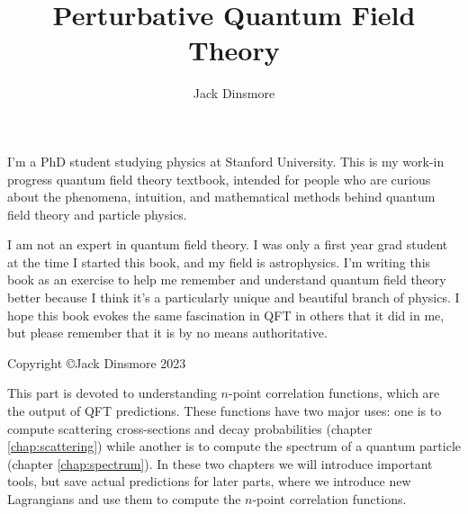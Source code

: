 \documentclass[11pt, a5paper]{memoir}
\title{Perturbative Quantum Field Theory}
\author{Jack Dinsmore}
\makeatletter
\let\LaTeXStandardPart\part
\newcommand{\unstarredpart@@noopt}[1]{
  \unstarredpart@@opt[#1]{#1}
}
\newcommand{\unstarredpart@@opt}[2][]{
  \cleardoublepage%
  \begingroup
  \let\newpage\relax
  \LaTeXStandardPart[#1]{#2}
  \endgroup
}
\newcommand{\starredpart}[1]{\LaTeXStandardPart*{#1}}
\newcommand{\unstarredpart}{\@ifnextchar[{\unstarredpart@@opt}{\unstarredpart@@noopt}}
\renewcommand{\part}{\@ifstar{\starredpart}{\unstarredpart}}
\newcounter{questioncounter}
\makeatother
\begin{document}
\setcounter{questioncounter}{1}

\frontmatter
\maketitle
\clearpage

\linespread{1.12}\selectfont
\begin{vplace}[0.7]
  \begin{adjustwidth}{0.5in}{0.5in}
    \centering
    \small 
    I'm a PhD student studying physics at Stanford University. This is my work-in progress quantum field theory textbook, intended for people who are curious about the phenomena, intuition, and mathematical methods behind quantum field theory and particle physics. 
  
    \vspace{1cm}

    I am not an expert in quantum field theory. I was only a first year grad student at the time I started this book, and  my field is astrophysics. I'm writing this book as an exercise to help me remember and understand quantum field theory better because I think it's a particularly unique and beautiful branch of physics. I hope this book evokes the same fascination in QFT in others that it did in me, but please remember that it is by no means authoritative.
    
    \vspace{1cm}
  
    Copyright \copyright Jack Dinsmore 2023
  \end{adjustwidth}
\end{vplace}
\clearpage
\linespread{1.0}\selectfont

\tableofcontents
\clearpage
\linespread{1.12}\selectfont


\clearpage

\clearpage

\mainmatter


\part{Non-Perturbative Techniques}
This part is devoted to understanding $n$-point correlation functions, which are the output of QFT predictions. These functions have two major uses: one is to compute scattering cross-sections and decay probabilities (chapter \ref{chap:scattering}) while another is to compute the spectrum of a quantum particle (chapter \ref{chap:spectrum}). In these two chapters we will introduce important tools, but save actual predictions for later parts, where we introduce new Lagrangians and use them to compute the $n$-point correlation functions.
\end{document}

